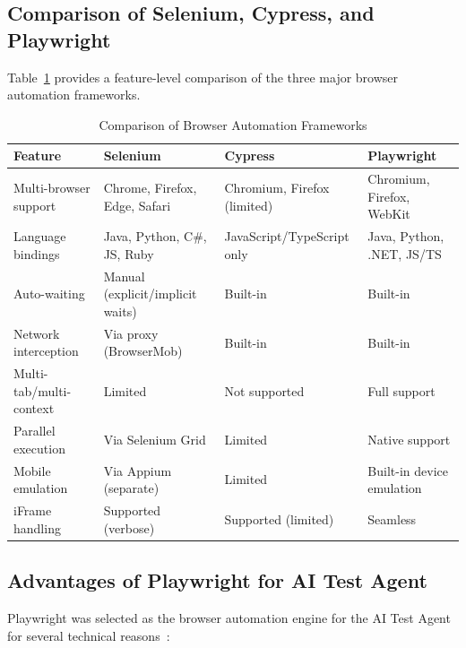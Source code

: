 \subsection{Comparison of Selenium, Cypress, and Playwright}
\label{subsec:framework_comparison}

Table~\ref{tab:browser_comparison} provides a feature-level comparison
of the three major browser automation frameworks.

\begin{table}[H]
\centering
\caption{Comparison of Browser Automation Frameworks}
\label{tab:browser_comparison}
\small
\begin{tabularx}{\textwidth}{@{} l X X X @{}}
\toprule
\textbf{Feature} & \textbf{Selenium} & \textbf{Cypress} & \textbf{Playwright} \\
\midrule
Multi-browser support & Chrome, Firefox, Edge, Safari & Chromium, Firefox (limited) & Chromium, Firefox, WebKit \\
Language bindings & Java, Python, C\#, JS, Ruby & JavaScript/TypeScript only & Java, Python, .NET, JS/TS \\
Auto-waiting & Manual (explicit/implicit waits) & Built-in & Built-in \\
Network interception & Via proxy (BrowserMob) & Built-in & Built-in \\
Multi-tab/multi-context & Limited & Not supported & Full support \\
Parallel execution & Via Selenium Grid & Limited & Native support \\
Mobile emulation & Via Appium (separate) & Limited & Built-in device emulation \\
iFrame handling & Supported (verbose) & Supported (limited) & Seamless \\
\bottomrule
\end{tabularx}
\end{table}

\subsection{Advantages of Playwright for AI Test Agent}
\label{subsec:playwright_advantages}

Playwright was selected as the browser automation engine for the AI
Test Agent for several technical reasons~\cite{playwright2024}:

